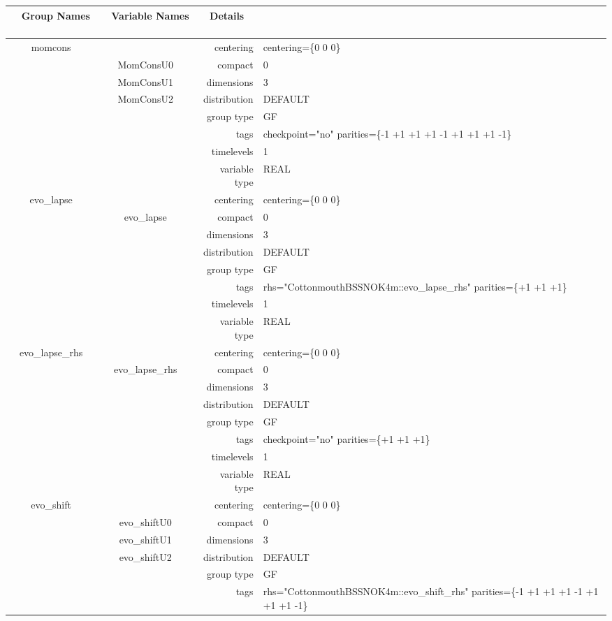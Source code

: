 \begin{tabular*}{150mm}{|c|c@{\extracolsep{\fill}}|rl|} \hline 
~ {\bf Group Names} ~ & ~ {\bf Variable Names} ~  &{\bf Details} ~ & ~ \\ 
\hline 
momcons &  & centering & centering=\{0 0 0\} \\ 
 & MomConsU0 & compact & 0 \\ 
 & MomConsU1 & dimensions & 3 \\ 
 & MomConsU2 & distribution & DEFAULT \\ 
 &  & group type & GF \\ 
 &  & tags & checkpoint="no" parities=\{-1 +1 +1  +1 -1 +1  +1 +1 -1\} \\ 
 &  & timelevels & 1 \\ 
 &  & variable type & REAL \\ 
\hline 
evo\_lapse &  & centering & centering=\{0 0 0\} \\ 
 & evo\_lapse & compact & 0 \\ 
 &  & dimensions & 3 \\ 
 &  & distribution & DEFAULT \\ 
 &  & group type & GF \\ 
 &  & tags & rhs="CottonmouthBSSNOK4m::evo\_lapse\_rhs" parities=\{+1 +1 +1\} \\ 
 &  & timelevels & 1 \\ 
 &  & variable type & REAL \\ 
\hline 
evo\_lapse\_rhs &  & centering & centering=\{0 0 0\} \\ 
 & evo\_lapse\_rhs & compact & 0 \\ 
 &  & dimensions & 3 \\ 
 &  & distribution & DEFAULT \\ 
 &  & group type & GF \\ 
 &  & tags & checkpoint="no" parities=\{+1 +1 +1\} \\ 
 &  & timelevels & 1 \\ 
 &  & variable type & REAL \\ 
\hline 
evo\_shift &  & centering & centering=\{0 0 0\} \\ 
 & evo\_shiftU0 & compact & 0 \\ 
 & evo\_shiftU1 & dimensions & 3 \\ 
 & evo\_shiftU2 & distribution & DEFAULT \\ 
 &  & group type & GF \\ 
 &  & tags & rhs="CottonmouthBSSNOK4m::evo\_shift\_rhs" parities=\{-1 +1 +1  +1 -1 +1  +1 +1 -1\} \\ 

\end{tabular*}
